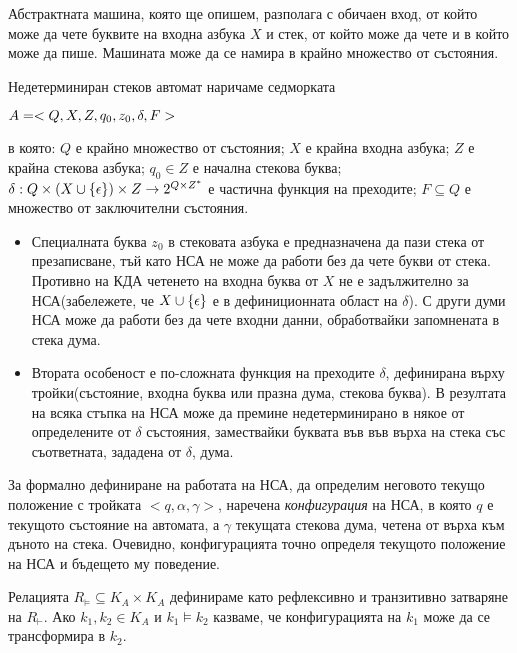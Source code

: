 \documentclass[11pt]{article} %
\begin{document}
{Абстрактната машина, която ще опишем, разполага с обичаен вход, от който може да чете буквите на входна азбука $X$ и стек, от който може да чете и в който може да пише. Машината може да се намира в крайно множество от състояния. \par 

 Недетерминиран стеков автомат наричаме седморката \\ 
\centerline{$A = <Q, X, Z, q_{0}, z_{0}, \delta, F>$}
в която: $Q$ е крайно множество от състояния; $X$ е крайна входна азбука; $Z$ е крайна стекова азбука; $q_{0} \in Z$ е начална стекова буква; $\delta: Q \times (X \cup \{\epsilon\}) \times Z \to 2^{Q \times Z^*}$ е частична функция на преходите; $F \subseteq Q$ е множество от заключителни състояния. \par

\begin{itemize}
	\item Специалната буква $z_{0}$ в стековата азбука е предназначена да пази стека от презаписване, тъй като НСА не може да работи без да чете букви от стека. Противно на КДА четенето на входна буква от $X$ не е задължително за НСА(забележете, че $X \cup \{\epsilon\}$ е в дефиниционната област на $\delta$). С други думи НСА може да работи без да чете входни данни, обработвайки запомнената в стека дума.
	\item Втората особеност е по-сложната функция на преходите $\delta$, дефинирана върху тройки(състояние, входна буква или празна дума, стекова буква). В резултата на всяка стъпка на НСА може да премине недетерминирано в някое от определените от $\delta$ състояния, замествайки буквата във във върха на стека със съответната, зададена от $\delta$, дума.  
\end{itemize} \par

За формално дефиниране на работата на НСА, да определим неговото текущо положение с тройката $< q, \alpha, \gamma >$, наречена \emph{конфигурация} на НСА, в която $q$ е текущото състояние на автомата, а $\gamma$ текущата стекова дума, четена от върха към дъното на стека. Очевидно, конфигурацията точно определя текущото положение на НСА и бъдещето му поведение. \par

 Релацията $R_{\models} \subseteq K_{A} \times K_{A}$ дефинираме като рефлексивно и транзитивно затваряне на $R_{\vdash}$. Ако $k_{1}, k_{2} \in K_{A}$ и $k_{1} \models k_{2}$ казваме, че конфигурацията на $k_{1}$ може да се трансформира в $k_{2}$. \par

}
\end{document}
